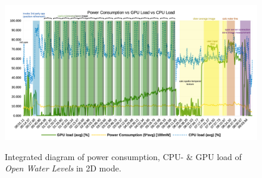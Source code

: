 \documentclass[review]{elsarticle}
\begin{document}
\begin{figure}[htbp!]
\begin{center}
	 	{\includegraphics[keepaspectratio, width=0.95\columnwidth]{graphics/OWL_Nexus5/Power_GPU_CPU_run2}}
	\caption{Integrated diagram of power consumption, CPU- \& GPU load of \textit{Open Water Levels} in 2D mode.}
\end{center}
\label{fig:power:Power_CPU_GPU_OWL:2D}
\end{figure}
\end{document}
